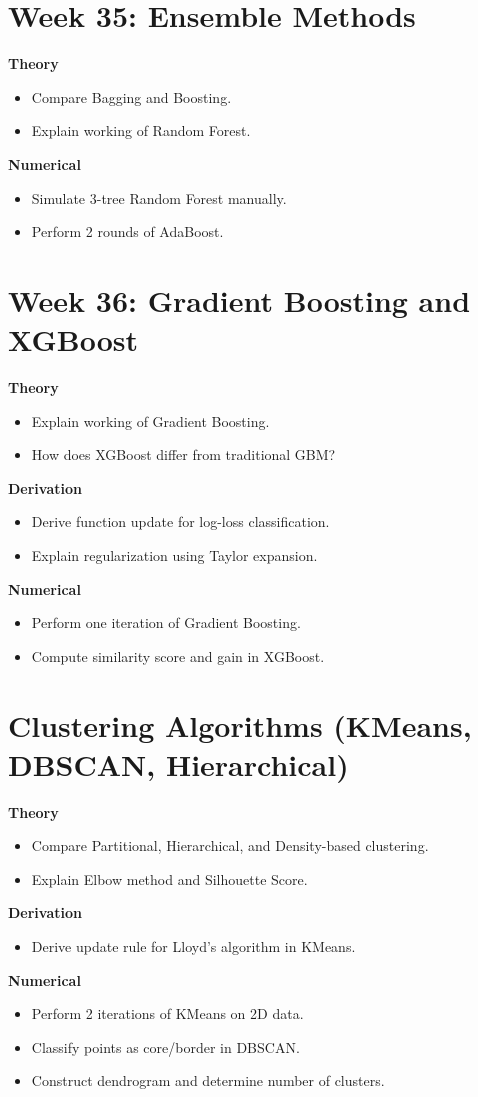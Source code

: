 \documentclass[12pt]{article}
\begin{document}
\section*{Week 35: Ensemble Methods}
\textbf{Theory}
\begin{itemize}
\item Compare Bagging and Boosting.
\item Explain working of Random Forest.
\end{itemize}

\textbf{Numerical}
\begin{itemize}
\item Simulate 3-tree Random Forest manually.
\item Perform 2 rounds of AdaBoost.
\end{itemize}

\section*{Week 36: Gradient Boosting and XGBoost}
\textbf{Theory}
\begin{itemize}
\item Explain working of Gradient Boosting.
\item How does XGBoost differ from traditional GBM?
\end{itemize}

\textbf{Derivation}
\begin{itemize}
\item Derive function update for log-loss classification.
\item Explain regularization using Taylor expansion.
\end{itemize}

\textbf{Numerical}
\begin{itemize}
\item Perform one iteration of Gradient Boosting.
\item Compute similarity score and gain in XGBoost.
\end{itemize}

\section*{Clustering Algorithms (KMeans, DBSCAN, Hierarchical)}
\textbf{Theory}
\begin{itemize}
\item Compare Partitional, Hierarchical, and Density-based clustering.
\item Explain Elbow method and Silhouette Score.
\end{itemize}

\textbf{Derivation}
\begin{itemize}
\item Derive update rule for Lloyd’s algorithm in KMeans.
\end{itemize}

\textbf{Numerical}
\begin{itemize}
\item Perform 2 iterations of KMeans on 2D data.
\item Classify points as core/border in DBSCAN.
\item Construct dendrogram and determine number of clusters.
\end{itemize}
\end{document}
